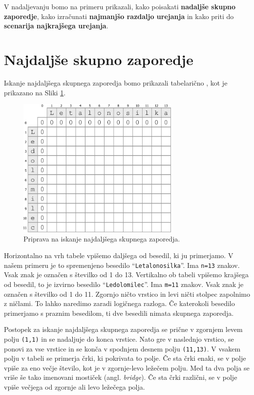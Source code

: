 \documentclass[a4paper, 12pt, twoside]{book}
\begin{document}
V nadaljevanju bomo na primeru prikazali, kako poisakati \textbf{nadaljše skupno zaporedje}, kako izračunati \textbf{najmanjšo razdaljo urejanja} in kako priti do \textbf{scenarija najkrajšega urejanja}.

\section{Najdaljše skupno zaporedje}
\label{sec:lcs}

Iskanje najdaljšega skupnega zaporedja bomo prikazali tabelarično \cite{lcs}, kot je prikazano na Sliki \ref{lcs1}. 

\begin{figure}[placement h]
\begin{center}
\includegraphics[width=8cm]{img/lcs1.pdf}
\end{center}
\caption{Priprava na iskanje najdaljšega skupnega zaporedja.}
\label{lcs1}
\end{figure}

Horizontalno na vrh tabele vpišemo daljšega od besedil, ki ju primerjamo. V našem primeru je to spremenjeno besedilo “{\tt Letalonosilka}”. Ima  {\tt n=13} znakov. Vsak znak je označen s številko od 1 do 13. Vertikalno ob tabeli vpišemo krajšega od besedil, to je izvirno besedilo “{\tt Ledolomilec}”. Ima  {\tt m=11} znakov. Vsak znak je označen s številko od 1 do 11. Zgornjo ničto vrstico in levi ničti stolpec zapolnimo z ničlami. To lahko naredimo zaradi logičnega razloga. Če katerokoli besedilo primerjamo s praznim besedilom, ti dve besedili nimata skupnega zaporedja.

Postopek za iskanje najdaljšega skupnega zaporedja se prične v zgornjem levem polju {\tt (1,1)} in se nadaljuje do konca vrstice. Nato gre v naslednjo vrstico, se ponovi za vse vrstice in se konča v spodnjem desnem polju {\tt (11,13)}. V vsakem polju v tabeli se primerja črki, ki pokrivata to polje. Če sta črki enaki, se v polje vpiše za eno večje število, kot je v zgornje-levo ležečem polju. Med ta dva polja se vriše še tako imenovani mostiček (angl. \textit{bridge}). Če sta črki različni, se v polje vpiše večjega od zgornje ali levo ležečega polja.
\end{document}
